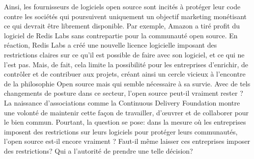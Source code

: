                 Ainsi, les fournisseurs de logiciels open source sont incités à protéger leur code contre les sociétés qui poursuivent uniquement un objectif marketing monétisant ce qui devrait être librement disponible.
                Par exemple, Amazon a tiré profit du logiciel de Redis Labs sans contrepartie pour la communauté open source. En réaction, Redis Labs a créé une nouvelle licence logicielle imposant des restrictions claires sur ce qu’il est possible de faire avec son logiciel, et ce qui ne l’est pas.
                Mais, de fait, cela limite la possibilité pour les entreprises d’enrichir, de contrôler et de contribuer aux projets, créant ainsi un cercle vicieux à l'encontre de la philosophie Open source mais qui semble nécessaire à sa survie. 
                Avec de tels changements de posture dans ce secteur, l'open source peut-il vraiment rester ? La naissance d'associations comme la Continuous Delivery Foundation montre une volonté de maintenir cette façon de travailler, d’œuvrer et de collaborer pour le bien commun. Pourtant, la question se pose: dans la mesure où les entreprises imposent des restrictions sur leurs logiciels pour protéger leurs communautés, l’open source est-il encore vraiment ? Faut-il même laisser ces entreprises imposer des restrictions? Qui a l’autorité de prendre une telle décision?
